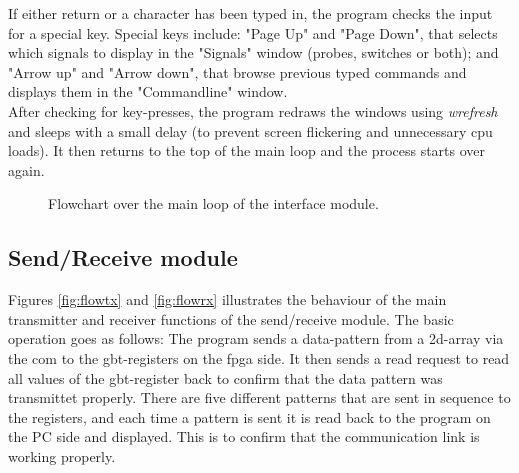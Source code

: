 \documentclass[main.tex]{subfiles}
\begin{document}
If either return or a character has been typed in, the program checks the input for a special key. Special keys include: "Page Up" and "Page Down", that selects which signals to display in the "Signals" window (probes, switches or both); and "Arrow up" and "Arrow down", that browse previous typed commands and displays them in the "Commandline" window.\\

After checking for key-presses, the program redraws the windows using \textit{wrefresh} and sleeps with a small delay (to prevent screen flickering and unnecessary cpu loads). It then returns to the top of the main loop and the process starts over again. 

\begin{figure}[H] %
\begin{center}
\resizebox{1\linewidth}{!}{}
\caption{Flowchart over the main loop of the interface module.}
\label{fig:flowgui}
\end{center}
\end{figure}

\subsection{Send/Receive module}

Figures \ref{fig:flowtx} and \ref{fig:flowrx} illustrates the behaviour of the main transmitter and receiver functions of the send/receive module. The basic operation goes as follows: The program sends a data-pattern from a 2d-array via the \gls{com} to the \gls{gbt}-registers on the \gls{fpga} side. It then sends a read request to read all values of the \gls{gbt}-register back to confirm that the data pattern was transmittet properly. There are five different patterns that are sent in sequence to the registers, and each time a pattern is sent it is read back to the program on the PC side and displayed. This is to confirm that the communication link is working properly. \\
\end{document}
